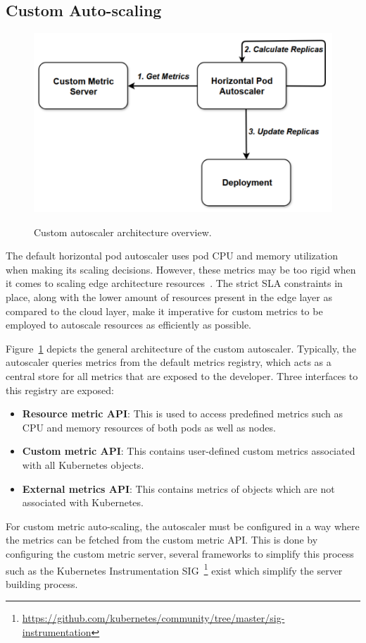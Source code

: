 \subsection{Custom Auto-scaling}
\label{subsec:ch2-custom-auto-scaling}

\begin{figure}[htb]
    \centering
    \caption{Custom autoscaler architecture overview.}
    \includegraphics[width=.7\linewidth]{Figures/Custom-Metrics-Autoscaling.pdf}
    \label{fig:custom-autoscale-overview}
\end{figure}

The default horizontal pod autoscaler uses pod CPU and memory utilization when making its scaling decisions. However, these metrics may be too rigid when it comes to scaling edge architecture resources~\cite{coulson2020adaptive}. The strict SLA constraints in place, along with the lower amount of resources present in the edge layer as compared to the cloud layer, make it imperative for custom metrics to be employed to autoscale resources as efficiently as possible.\par

Figure~\ref{fig:custom-autoscale-overview} depicts the general architecture of the custom autoscaler. Typically, the autoscaler queries metrics from the default metrics registry, which acts as a central store for all metrics that are exposed to the developer. Three interfaces to this registry are exposed:
\begin{itemize}
    \item \textbf{Resource metric API}: This is used to access predefined metrics such as CPU and memory resources of both pods as well as nodes.
    \item \textbf{Custom metric API}: This contains user-defined custom metrics associated with all Kubernetes objects.
    \item \textbf{External metrics API}: This contains metrics of objects which are not associated with Kubernetes.
\end{itemize}
For custom metric auto-scaling, the autoscaler must be configured in a way where the metrics can be fetched from the custom metric API. This is done by configuring the custom metric server, several frameworks to simplify this process such as the Kubernetes Instrumentation SIG~\footnote{\url{https://github.com/kubernetes/community/tree/master/sig-instrumentation}} exist which simplify the server building process.

